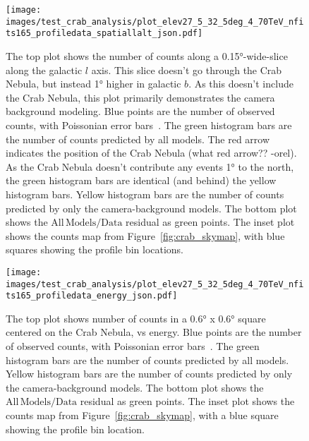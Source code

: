   \begin{figure}[p]
    \centering
    \texttt{[image: images/test\_crab\_analysis/plot\_elev27\_5\_32\_5deg\_4\_70TeV\_nfits165\_profiledata\_spatiallalt\_json.pdf]}
    \caption[Crab Nebula Profile along Galactic $l$ Off Source]
    {
      The top plot shows the number of counts along a \ang{0.15}-wide-slice along the galactic $l$ axis.
      This slice doesn't go through the Crab Nebula, but instead \ang{1} higher in galactic $b$.
      As this doesn't include the Crab Nebula, this plot primarily demonstrates the camera background modeling.
      Blue points are the number of observed counts, with Poissonian error bars~\cite{poissonfrequentistinterval}.
      The green histogram bars are the number of counts predicted by all models.
      The red arrow indicates the position of the Crab Nebula {\color{red}(what red arrow?? -orel)}.
      As the Crab Nebula doesn't contribute any events \ang{1} to the north, the green histogram bars are identical (and behind) the yellow histogram bars.
      Yellow histogram bars are the number of counts predicted by only the camera-background models.
      The bottom plot shows the $\mathrm{All\,Models}/\mathrm{Data}$ residual as green points.
      The inset plot shows the counts map from Figure~\ref{fig:crab_skymap}, with blue squares showing the profile bin locations.
    }
    \label{fig:crab_profile_l_off}
  \end{figure}

  \begin{figure}[p]
    \centering
    \texttt{[image: images/test\_crab\_analysis/plot\_elev27\_5\_32\_5deg\_4\_70TeV\_nfits165\_profiledata\_energy\_json.pdf]}
    \caption[Crab Nebula Profile in Energy]
    {
      The top plot shows number of counts in a \ang{0.6} x \ang{0.6} square centered on the Crab Nebula, vs energy.
      Blue points are the number of observed counts, with Poissonian error bars~\cite{poissonfrequentistinterval}.
      The green histogram bars are the number of counts predicted by all models.
      Yellow histogram bars are the number of counts predicted by only the camera-background models.
      The bottom plot shows the $\mathrm{All\,Models}/\mathrm{Data}$ residual as green points.
      The inset plot shows the counts map from Figure~\ref{fig:crab_skymap}, with a blue square showing the profile bin location.
    }
    \label{fig:crab_profile_energy}
  \end{figure}
    
